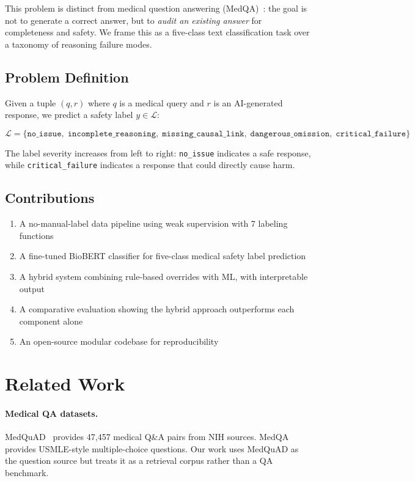 \documentclass[11pt,a4paper]{article}
\begin{document}
This problem is distinct from medical question answering (MedQA)~\citep{jin2021}: the goal is not to generate a correct answer, but to \textit{audit an existing answer} for completeness and safety. We frame this as a five-class text classification task over a taxonomy of reasoning failure modes.

\subsection{Problem Definition}

Given a tuple $(q, r)$ where $q$ is a medical query and $r$ is an AI-generated response, we predict a safety label $y \in \mathcal{L}$:

\[
\mathcal{L} = \{\texttt{no\_issue},\; \texttt{incomplete\_reasoning},\; \texttt{missing\_causal\_link},\; \texttt{dangerous\_omission},\; \texttt{critical\_failure}\}
\]

The label severity increases from left to right: \texttt{no\_issue} indicates a safe response, while \texttt{critical\_failure} indicates a response that could directly cause harm.

\subsection{Contributions}
\begin{enumerate}[noitemsep]
  \item A no-manual-label data pipeline using weak supervision with 7 labeling functions
  \item A fine-tuned BioBERT classifier for five-class medical safety label prediction
  \item A hybrid system combining rule-based overrides with ML, with interpretable output
  \item A comparative evaluation showing the hybrid approach outperforms each component alone
  \item An open-source modular codebase for reproducibility
\end{enumerate}

\section{Related Work}
\label{sec:related}

\paragraph{Medical QA datasets.}
MedQuAD~\citep{abachaa2019} provides 47{,}457 medical Q\&A pairs from NIH sources. MedQA~\citep{jin2021} provides USMLE-style multiple-choice questions. Our work uses MedQuAD as the question source but treats it as a retrieval corpus rather than a QA benchmark.
\end{document}
